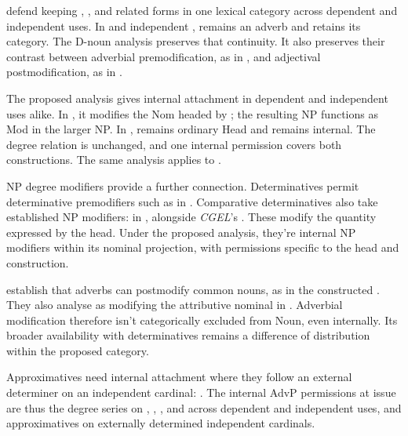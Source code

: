 \documentclass[12pt]{article}
\begin{document}
\textcite[40--42]{payne2010} defend keeping , , and related forms in one lexical category across dependent and independent uses. In  and independent ,  remains an adverb and  retains its category. The D-noun analysis preserves that continuity. It also preserves their contrast between adverbial premodification, as in , and adjectival postmodification, as in .

The proposed analysis gives  internal attachment in dependent and independent uses alike. In , it modifies the Nom headed by ; the resulting  NP functions as Mod in the larger NP. In ,  remains ordinary Head and  remains internal. The degree relation is unchanged, and one internal permission covers both constructions. The same analysis applies to .

NP degree modifiers provide a further connection. Determinatives permit determinative premodifiers such as  in  \citep[393]{huddleston2002}. Comparative determinatives also take established NP modifiers:  in , alongside \textit{CGEL}'s  \citep[432]{huddleston2002}. These modify the quantity expressed by the head. Under the proposed analysis, they're internal NP modifiers within its nominal projection, with permissions specific to the head and construction.

\textcite[42--47]{payne2010} establish that adverbs can postmodify common nouns, as in the constructed . They also analyse  as modifying the attributive nominal  in  \citep[p.~75, n.~3]{payne2010}. Adverbial modification therefore isn't categorically excluded from Noun, even internally. Its broader availability with determinatives remains a difference of distribution within the proposed category.

Approximatives need internal attachment where they follow an external determiner on an independent cardinal: . The internal AdvP permissions at issue are thus the degree series on , , , and  across dependent and independent uses, and approximatives on externally determined independent cardinals.
\end{document}
